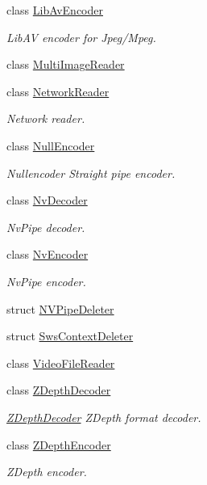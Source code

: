 \begin{DoxyCompactItemize}
class \hyperlink{classmoetsi_1_1ssp_1_1LibAvEncoder}{Lib\+Av\+Encoder}
\begin{DoxyCompactList}\small\item\em Lib\+AV encoder for Jpeg/\+Mpeg. \end{DoxyCompactList}\item 
class \hyperlink{classmoetsi_1_1ssp_1_1MultiImageReader}{Multi\+Image\+Reader}
\item 
class \hyperlink{classmoetsi_1_1ssp_1_1NetworkReader}{Network\+Reader}
\begin{DoxyCompactList}\small\item\em Network reader. \end{DoxyCompactList}\item 
class \hyperlink{classmoetsi_1_1ssp_1_1NullEncoder}{Null\+Encoder}
\begin{DoxyCompactList}\small\item\em Nullencoder Straight pipe encoder. \end{DoxyCompactList}\item 
class \hyperlink{classmoetsi_1_1ssp_1_1NvDecoder}{Nv\+Decoder}
\begin{DoxyCompactList}\small\item\em Nv\+Pipe decoder. \end{DoxyCompactList}\item 
class \hyperlink{classmoetsi_1_1ssp_1_1NvEncoder}{Nv\+Encoder}
\begin{DoxyCompactList}\small\item\em Nv\+Pipe encoder. \end{DoxyCompactList}\item 
struct \hyperlink{structmoetsi_1_1ssp_1_1NVPipeDeleter}{N\+V\+Pipe\+Deleter}
\item 
struct \hyperlink{structmoetsi_1_1ssp_1_1SwsContextDeleter}{Sws\+Context\+Deleter}
\item 
class \hyperlink{classmoetsi_1_1ssp_1_1VideoFileReader}{Video\+File\+Reader}
\item 
class \hyperlink{classmoetsi_1_1ssp_1_1ZDepthDecoder}{Z\+Depth\+Decoder}
\begin{DoxyCompactList}\small\item\em \hyperlink{classmoetsi_1_1ssp_1_1ZDepthDecoder}{Z\+Depth\+Decoder} Z\+Depth format decoder. \end{DoxyCompactList}\item 
class \hyperlink{classmoetsi_1_1ssp_1_1ZDepthEncoder}{Z\+Depth\+Encoder}
\begin{DoxyCompactList}\small\item\em Z\+Depth encoder. \end{DoxyCompactList}\end{DoxyCompactItemize}
